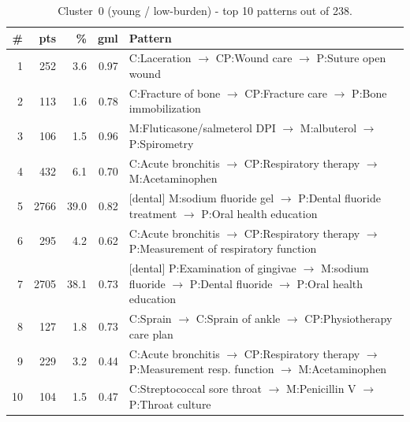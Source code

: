\begin{table}[H]
\centering
\footnotesize
\renewcommand{\arraystretch}{1.2}
\begin{tabular}{@{}r r r r p{10.5cm}@{}}
\toprule
\textbf{\#} & \textbf{pts} & \textbf{\%} & \textbf{gml} & \textbf{Pattern} \\
\midrule
1  &  252 &  3.6 & 0.97 & C:Laceration $\to$ CP:Wound care $\to$ P:Suture open wound \\
2  &  113 &  1.6 & 0.78 & C:Fracture of bone $\to$ CP:Fracture care $\to$ P:Bone immobilization \\
3  &  106 &  1.5 & 0.96 & M:Fluticasone/salmeterol DPI $\to$ M:albuterol $\to$ P:Spirometry \\
4  &  432 &  6.1 & 0.70 & C:Acute bronchitis $\to$ CP:Respiratory therapy $\to$ M:Acetaminophen \\
5  & 2766 & 39.0 & 0.82 & [dental] M:sodium fluoride gel $\to$ P:Dental fluoride treatment $\to$ P:Oral health education \\
6  &  295 &  4.2 & 0.62 & C:Acute bronchitis $\to$ CP:Respiratory therapy $\to$ P:Measurement of respiratory function \\
7  & 2705 & 38.1 & 0.73 & [dental] P:Examination of gingivae $\to$ M:sodium fluoride $\to$ P:Dental fluoride $\to$ P:Oral health education \\
8  &  127 &  1.8 & 0.73 & C:Sprain $\to$ C:Sprain of ankle $\to$ CP:Physiotherapy care plan \\
9  &  229 &  3.2 & 0.44 & C:Acute bronchitis $\to$ CP:Respiratory therapy $\to$ P:Measurement resp. function $\to$ M:Acetaminophen \\
10 &  104 &  1.5 & 0.47 & C:Streptococcal sore throat $\to$ M:Penicillin V $\to$ P:Throat culture \\
\bottomrule
\end{tabular}
\caption{Cluster~0 (young / low-burden) - top 10 patterns out of 238.}
\label{tab:ch6_seq_c0}
\end{table}


